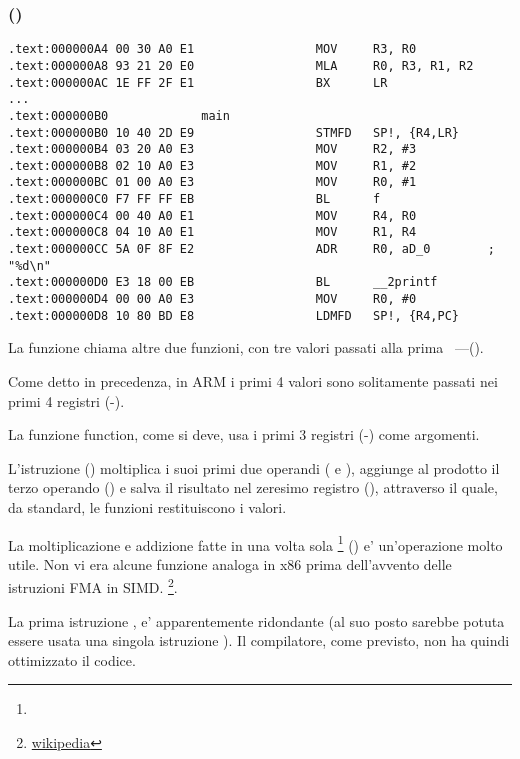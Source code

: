 \subsubsection{\NonOptimizingKeilVI (\ARMMode)}

\begin{lstlisting}
.text:000000A4 00 30 A0 E1                 MOV     R3, R0
.text:000000A8 93 21 20 E0                 MLA     R0, R3, R1, R2
.text:000000AC 1E FF 2F E1                 BX      LR
...
.text:000000B0             main
.text:000000B0 10 40 2D E9                 STMFD   SP!, {R4,LR}
.text:000000B4 03 20 A0 E3                 MOV     R2, #3
.text:000000B8 02 10 A0 E3                 MOV     R1, #2
.text:000000BC 01 00 A0 E3                 MOV     R0, #1
.text:000000C0 F7 FF FF EB                 BL      f
.text:000000C4 00 40 A0 E1                 MOV     R4, R0
.text:000000C8 04 10 A0 E1                 MOV     R1, R4
.text:000000CC 5A 0F 8F E2                 ADR     R0, aD_0        ; "%d\n"
.text:000000D0 E3 18 00 EB                 BL      __2printf
.text:000000D4 00 00 A0 E3                 MOV     R0, #0
.text:000000D8 10 80 BD E8                 LDMFD   SP!, {R4,PC}
\end{lstlisting}

La funzione \main chiama altre due funzioni, con tre valori passati alla prima ~---(\ttf).

Come detto in precedenza, in ARM i primi 4 valori sono solitamente passati nei primi 4 registri (-).

La funzione \ttf function, come si deve, usa i primi 3 registri (-) come argomenti.

L'istruzione  () 
moltiplica i suoi primi due operandi ( e ), aggiunge al prodotto il terzo operando () e salva il risultato
nel zeresimo registro (), attraverso il quale, da standard, le funzioni restituiscono i valori.

La moltiplicazione e addizione fatte in una volta sola \footnote{\WPMAO} () e' un'operazione molto utile. 
Non vi era alcune funzione analoga in x86 prima dell'avvento delle istruzioni FMA in SIMD.
\footnote{\href{http://go.yurichev.com/17103}{wikipedia}}.

La prima istruzione , 
e' apparentemente ridondante (al suo posto sarebbe potuta essere usata una singola istruzione ). 
Il compilatore, come previsto, non ha quindi ottimizzato il codice.

